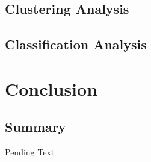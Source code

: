 \documentclass[12pt, a4paper]{article}
\begin{document}

    \subsection{Clustering Analysis}\label{subsec:clustering-analysis}

    \subsection{Classification Analysis}\label{subsec:classification-analysis}

    \section*{Conclusion}

    \subsection{Summary}\label{subsec:summary}
    Pending Text
\end{document}
